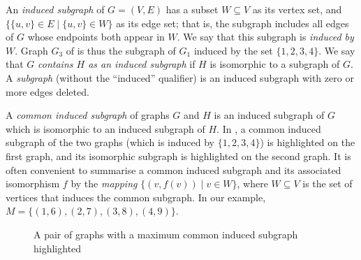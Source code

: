 An \emph{induced subgraph} of $G = (V, E)$ has a subset $W \subseteq V$ as its
vertex set, and $\{\{u, v\} \in E \mid \{u, v\} \in W\}$ as its edge set; that
is, the subgraph includes all edges of $G$ whose endpoints both appear in
$W$.  We say that this subgraph is \emph{induced by} $W$.
Graph $G_3$ of  is thus the subgraph
of $G_1$ induced by the set $\{1,2,3,4\}$.  We say that $G$ \emph{contains
$H$ as an induced subgraph} if $H$ is isomorphic to a subgraph of $G$.
A \emph{subgraph} (without the ``induced'' qualifier) is an induced subgraph
with zero or more edges deleted.

A \emph{common induced subgraph} of graphs $G$ and $H$ is an induced subgraph
of $G$ which is isomorphic to an induced subgraph of $H$. In
, a common induced subgraph of the two graphs (which is
induced by $\{1,2,3,4\}$) is highlighted on the first graph, and its isomorphic
subgraph is highlighted on the second graph.  It is often convenient to summarise
a common induced subgraph and its associated isomorphism $f$ by the \emph{mapping}
$\{(v,f(v)) \mid v \in W\}$, where $W \subseteq V$ is the set of vertices that
induces the common subgraph.  In our example, $M = \{(1,6), (2,7), (3,8), (4,9)\}$.

\begin{figure}[h!]
\centering
{}
\qquad
{}
\caption{A pair of graphs with a maximum common induced subgraph highlighted}
\label{fig:cis-example}
\end{figure}

